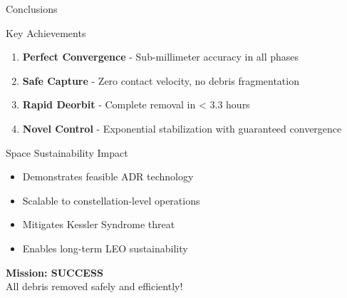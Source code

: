 \documentclass[aspectratio=169]{beamer}
\begin{document}
\begin{frame}{Conclusions}
\begin{block}{Key Achievements}
\begin{enumerate}
    \item \textbf{Perfect Convergence} - Sub-millimeter accuracy in all phases
    \item \textbf{Safe Capture} - Zero contact velocity, no debris fragmentation
    \item \textbf{Rapid Deorbit} - Complete removal in < 3.3 hours
    \item \textbf{Novel Control} - Exponential stabilization with guaranteed convergence
\end{enumerate}
\end{block}

\begin{block}{Space Sustainability Impact}
\begin{itemize}
    \item Demonstrates feasible ADR technology
    \item Scalable to constellation-level operations
    \item Mitigates Kessler Syndrome threat
    \item Enables long-term LEO sustainability
\end{itemize}
\end{block}

\begin{center}
\Large\textbf{Mission: SUCCESS}\\[0.5em]
\large All debris removed safely and efficiently!
\end{center}
\end{frame}
\end{document}
